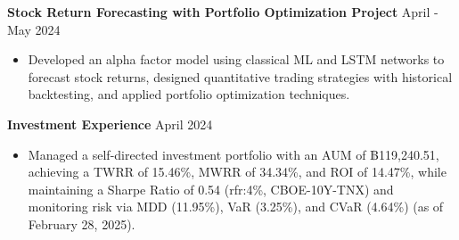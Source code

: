 \documentclass[a4paper, 11pt]{article}
\begin{document}
\textbf{Stock Return Forecasting with Portfolio Optimization Project} \hfill April - May 2024
\begin{itemize}[noitemsep, topsep=0pt, partopsep=0pt, parsep=0pt, leftmargin=20pt]
    \item Developed an alpha factor model using classical ML and LSTM networks to forecast stock returns, designed quantitative trading strategies with historical backtesting, and applied portfolio optimization techniques.
\end{itemize}

\vspace{3pt}



\textbf{Investment Experience} \hfill April 2024
\begin{itemize}[noitemsep, topsep=0pt, partopsep=0pt, parsep=0pt, leftmargin=20pt]
    \item Managed a self-directed investment portfolio with an AUM of ฿119,240.51, achieving a TWRR of 15.46\%, MWRR of 34.34\%, and ROI of 14.47\%, while maintaining a Sharpe Ratio of 0.54 (rfr:4\%, CBOE-10Y-TNX) and monitoring risk via MDD (11.95\%), VaR (3.25\%), and CVaR (4.64\%) (as of February 28, 2025).
\end{itemize}
\vspace{3pt}
\end{document}
